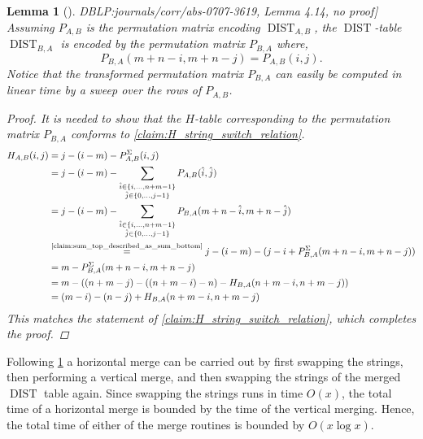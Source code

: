 \documentclass[twoside,11pt,openright]{report}
\newcommand{\DIST}{\operatorname{DIST}}
\newcommand{\refbook}[2]{\cite[#1]{DBLP:journals/corr/abs-0707-3619}, #2}
\newtheorem{lemma}{Lemma}
\begin{document}
\begin{lemma}[\refbook{p.-52}{Lemma 4.14, no proof}]
  \label{lemma:swap_strings}
  Assuming $P_{A,B}$ is the permutation matrix encoding $\DIST_{A,B}$, the $\DIST$-table $\DIST_{B,A}$ is encoded by the permutation matrix $P_{B,A}$ where,
  \[
    P_{B,A}(m + n - i, m + n - j) = P_{A,B}(i, j).
  \]
  Notice that the transformed permutation matrix $P_{B,A}$ can easily be computed in linear time by a sweep over the rows of $P_{A,B}$.
  \begin{proof}
    It is needed to show that the $H$-table corresponding to the permutation matrix $P_{B,A}$ conforms to \cref{claim:H_string_switch_relation}.
    \begin{align*}
      H_{A,B}(i, j) &= j - (i - m) - P_{A,B}^{\Sigma}(i, j) \\
        &= j - (i - m) - \sum_{\substack{ \hat{i} \in \{i,\dots,n+m - 1\} \\ \hat{j} \in \{0, \dots, j - 1\}}} P_{A,B}(\hat{i}, \hat{j}) \\
        &= j - (i - m) - \sum_{\substack{ \hat{i} \in \{i, \dots, n + m - 1\} \\ \hat{j} \in \{ 0, \dots, j - 1 \}}} P_{B,A}(m + n - \hat{i}, m + n - \hat{j}) \\
        &\overset{\text{\cref{claim:sum_top_described_as_sum_bottom}}}{=} j - (i - m) - (j - i + P_{B,A}^{\Sigma}(m + n - i, m + n - j)) \\
        &= m - P_{B,A}^{\Sigma}(m + n - i, m + n - j) \\
        &= m - \left( (n + m - j) - ((n + m - i) - n) - H_{B,A}(n + m - i, n + m - j) \right) \\
        &= (m - i) - (n - j) + H_{B,A}(n + m - i, n + m - j)
    \end{align*}
    This matches the statement of \cref{claim:H_string_switch_relation}, which completes the proof.
  \end{proof}
\end{lemma}
%
Following \cref{lemma:swap_strings} a horizontal merge can be carried out by first swapping the strings, then performing a vertical merge, and then swapping the strings of the merged $\DIST$ table again. Since swapping the strings runs in time $O(x)$, the total time of a horizontal merge is bounded by the time of the vertical merging. Hence, the total time of either of the merge routines is bounded by $O(x\log{x})$.
\end{document}
